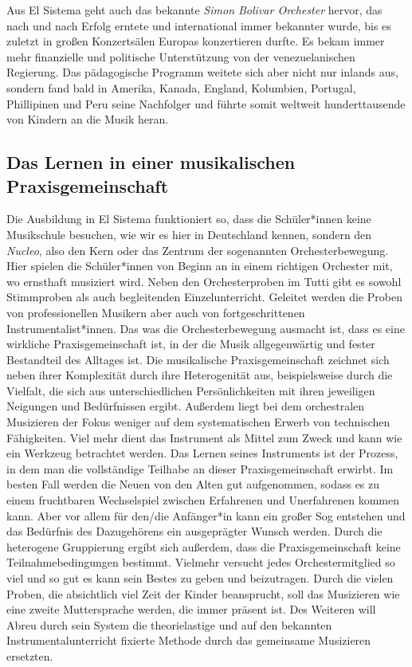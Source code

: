 Aus El Sistema geht auch das bekannte \emph{Simon Bolivar Orchester} hervor, das
nach und nach Erfolg erntete und international immer bekannter wurde, bis es
zuletzt in großen Konzertsälen Europas konzertieren durfte. Es bekam immer mehr
finanzielle und politische Unterstützung von der venezuelanischen Regierung. Das
pädagogische Programm weitete sich aber nicht nur inlands aus, sondern fand bald
in Amerika, Kanada, England, Kolumbien, Portugal, Phillipinen und Peru seine
Nachfolger und führte somit weltweit hunderttausende von Kindern an die Musik
heran. 

\subsection{Das Lernen in einer musikalischen Praxisgemeinschaft}
Die Ausbildung in El Sistema funktioniert so, dass die Schüler*innen keine
Musikschule besuchen, wie wir es hier in Deutschland kennen, sondern den
\emph{Nucleo}, also den Kern oder das Zentrum der sogenannten Orchesterbewegung.
Hier spielen die Schüler*innen von Beginn an in einem richtigen Orchester mit,
wo ernsthaft musiziert wird. Neben den Orchesterproben im Tutti gibt es sowohl
Stimmproben als auch begleitenden Einzelunterricht. Geleitet werden die Proben
von professionellen Musikern aber auch von fortgeschrittenen
Instrumentalist*innen.
\autocite[45]{kaufmann:el_sistema} 
Das was die Orchesterbewegung ausmacht ist, dass es eine wirkliche
Praxisgemeinschaft ist, in der die Musik allgegenwärtig und fester Bestandteil
des Alltages ist. Die musikalische Praxisgemeinschaft zeichnet sich neben
ihrer Komplexität durch ihre Heterogenität aus, beispielsweise durch die Vielfalt, die sich aus
unterschiedlichen Persönlichkeiten mit ihren jeweiligen Neigungen und
Bedürfnissen ergibt. \autocite[161]{roebke_mantilla:vom_wilden_lernen} Außerdem
liegt bei dem orchestralen Musizieren der Fokus weniger auf dem systematischen
Erwerb von technischen Fähigkeiten. Viel mehr dient das Instrument als Mittel
zum Zweck und kann wie ein Werkzeug betrachtet werden. Das Lernen seines Instruments ist der Prozess,
in dem man die vollständige Teilhabe an dieser Praxisgemeinschaft erwirbt. Im
besten Fall werden die Neuen von den Alten gut aufgenommen, sodass es zu einem
fruchtbaren Wechselspiel zwischen Erfahrenen und Unerfahrenen kommen kann. Aber
vor allem für den/die Anfänger*in kann ein großer Sog entstehen und das
Bedürfnis des Dazugehörens ein ausgeprägter Wunsch werden. Durch die heterogene
Gruppierung ergibt sich außerdem, dass die Praxisgemeinschaft keine
Teilnahmebedingungen bestimmt. Vielmehr versucht jedes Orchestermitglied so viel
und so gut es kann sein Bestes zu geben und beizutragen. Durch die vielen
Proben, die absichtlich viel Zeit der Kinder beansprucht, soll das Musizieren
wie eine zweite Muttersprache werden, die immer präsent ist.
\autocite[162]{kaufmann:el_sistema} Des Weiteren will Abreu durch sein System
die theorielastige und auf den bekannten Instrumentalunterricht fixierte Methode
durch das gemeinsame Musizieren ersetzten. 
\autocite[45]{kaufmann:el_sistema}




